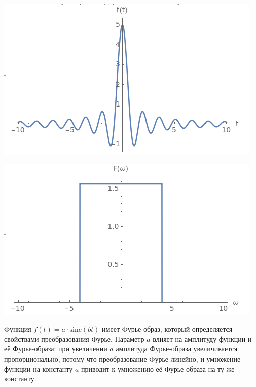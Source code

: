 \documentclass[a4paper,12pt]{article}
\begin{document}
\begin{center}
\begin{minipage}{0.48\textwidth}
  \centering
  \includegraphics[width=\linewidth]{images/3f54.png}
\end{minipage}
\hfill
\begin{minipage}{0.48\textwidth}
  \centering
  \includegraphics[width=\linewidth]{images/3F54.png}
\end{minipage}
\end{center}

Функция \( f(t) = a \cdot \text{sinc}(b t) \) имеет Фурье-образ, который определяется свойствами преобразования Фурье. Параметр \( a \) влияет на амплитуду функции и её Фурье-образа: при увеличении \( a \) амплитуда Фурье-образа увеличивается пропорционально, потому что преобразование Фурье линейно, и умножение функции на константу \( a \) приводит к умножению её Фурье-образа на ту же константу.
\end{document}
